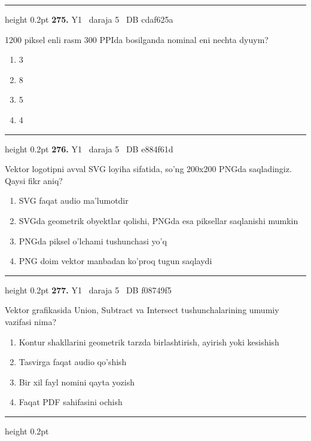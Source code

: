 \documentclass[10pt,a4paper,oneside]{article}
\begin{document}
\vspace{2mm}\hrule height 0.2pt \vspace{4mm}
\hypertarget{q275}{\textbf{\color{ink}275.}}  {\color{muted}\scriptsize Y1 \textbullet\ daraja 5 \textbullet\ DB cdaf625a}
\par
1200 piksel enli rasm 300 PPIda bosilganda nominal eni nechta dyuym?
\begin{enumerate}[label=\Alph*),leftmargin=9mm]
\item 3
\item 8
\item 5
\item 4
\end{enumerate}
\vspace{2mm}\hrule height 0.2pt \vspace{4mm}
\hypertarget{q276}{\textbf{\color{ink}276.}}  {\color{muted}\scriptsize Y1 \textbullet\ daraja 5 \textbullet\ DB e884f61d}
\par
Vektor logotipni avval SVG loyiha sifatida, so'ng 200x200 PNGda saqladingiz. Qaysi fikr aniq?
\begin{enumerate}[label=\Alph*),leftmargin=9mm]
\item SVG faqat audio ma'lumotdir
\item SVGda geometrik obyektlar qolishi, PNGda esa piksellar saqlanishi mumkin
\item PNGda piksel o'lchami tushunchasi yo'q
\item PNG doim vektor manbadan ko'proq tugun saqlaydi
\end{enumerate}
\vspace{2mm}\hrule height 0.2pt \vspace{4mm}
\hypertarget{q277}{\textbf{\color{ink}277.}}  {\color{muted}\scriptsize Y1 \textbullet\ daraja 5 \textbullet\ DB f08749f5}
\par
Vektor grafikasida Union, Subtract va Intersect tushunchalarining umumiy vazifasi nima?
\begin{enumerate}[label=\Alph*),leftmargin=9mm]
\item Kontur shakllarini geometrik tarzda birlashtirish, ayirish yoki kesishish
\item Tasvirga faqat audio qo'shish
\item Bir xil fayl nomini qayta yozish
\item Faqat PDF sahifasini ochish
\end{enumerate}
\vspace{2mm}\hrule height 0.2pt \vspace{4mm}
\end{document}
